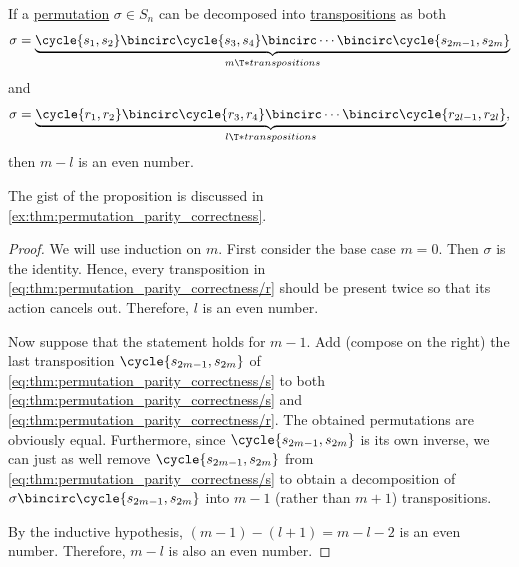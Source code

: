 \begin{lemma}\label{thm:permutation_parity_correctness}
  If a \hyperref[def:symmetric_group]{permutation} \( \sigma \in S_n \) can be decomposed into \hyperref[def:transposition]{transpositions} as both
  \begin{equation}\label{eq:thm:permutation_parity_correctness/s}
    \sigma = \underbrace{\cycle{ s_1, s_2 } \bincirc \cycle{ s_3, s_4 } \bincirc \cdots \bincirc \cycle{ s_{2m-1}, s_{2m} }}_{m \T*{transpositions}}
  \end{equation}
  and
  \begin{equation}\label{eq:thm:permutation_parity_correctness/r}
    \sigma = \underbrace{\cycle{ r_1, r_2 } \bincirc \cycle{ r_3, r_4 } \bincirc \cdots \bincirc \cycle{ r_{2l-1}, r_{2l} }}_{l \T*{transpositions}},
  \end{equation}
  then \( m - l \) is an even number.
\end{lemma}
\begin{comments}
  \item The gist of the proposition is discussed in \cref{ex:thm:permutation_parity_correctness}.
\end{comments}
\begin{proof}
  We will use induction on \( m \). First consider the base case \( m = 0 \). Then \( \sigma \) is the identity. Hence, every transposition in \eqref{eq:thm:permutation_parity_correctness/r} should be present twice so that its action cancels out. Therefore, \( l \) is an even number.

  Now suppose that the statement holds for \( m - 1 \). Add (compose on the right) the last transposition \( \cycle{ s_{2m-1}, s_{2m} } \) of \eqref{eq:thm:permutation_parity_correctness/s} to both \eqref{eq:thm:permutation_parity_correctness/s} and \eqref{eq:thm:permutation_parity_correctness/r}. The obtained permutations are obviously equal. Furthermore, since \( \cycle{ s_{2m-1}, s_{2m} } \) is its own inverse, we can just as well remove \( \cycle{ s_{2m-1}, s_{2m} } \) from \eqref{eq:thm:permutation_parity_correctness/s} to obtain a decomposition of \( \sigma \bincirc \cycle{ s_{2m-1}, s_{2m} } \) into \( m - 1 \) (rather than \( m + 1 \)) transpositions.

  By the inductive hypothesis, \( (m - 1) - (l + 1) = m - l - 2 \) is an even number. Therefore, \( m - l \) is also an even number.
\end{proof}

